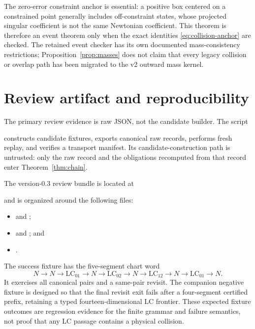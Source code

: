 \documentclass[11pt]{article}
\newcommand{\LC}{\mathrm{LC}}
\begin{document}
The zero-error constraint anchor is essential: a positive box centered on a
constrained point generally includes off-constraint states, whose projected
singular coefficient is not the same Newtonian coefficient.  This theorem is
therefore an event theorem only when the exact identities
\eqref{eq:collision-anchor} are checked.  The retained event checker has its
own documented mass-consistency restrictions; Proposition~\ref{prop:masses}
does not claim that every legacy collision or overlap path has been migrated
to the v2 outward mass kernel.

\section{Review artifact and reproducibility}
\label{sec:artifact}

The primary review evidence is raw JSON, not the candidate builder.  The
script
\begin{center}
\end{center}
constructs candidate fixtures, exports canonical raw records, performs fresh
replay, and verifies a transport manifest.  Its candidate-construction path
is untrusted: only the raw record and the obligations recomputed from that
record enter Theorem~\ref{thm:chain}.

The version-0.3 review bundle is located at
\begin{center}
\end{center}
and is organized around the following files:
\begin{itemize}
\item {} and ;
\item {} and
      ; and
\item {}.
\end{itemize}
The success fixture has the five-segment chart word
\[
 N\to N\to\LC_{01}\to N\to\LC_{02}\to N
 \to\LC_{12}\to N\to\LC_{01}\to N.
\]
It exercises all canonical pairs and a same-pair revisit.  The companion
negative fixture is designed so that the final revisit exit fails after a
four-segment certified prefix, retaining a typed fourteen-dimensional LC
frontier.  These expected fixture outcomes are regression evidence for the
finite grammar and failure semantics, not proof that any LC passage contains
a physical collision.
\end{document}
